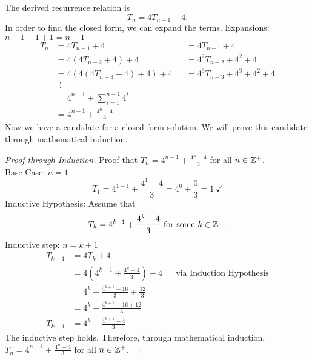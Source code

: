 \documentclass{article}
\begin{document}
\qdash

The derived recurrence relation is
\[
    T_n = 4T_{n-1} + 4.
\]
In order to find the closed form, we can expand the terms. Expansions: $n-1-1+1 = n-1$
\begin{align*}
    T_n & = 4T_{n-1} + 4                     &  & = 4T_{n-1} + 4               \\
        & = 4(4T_{n-2} + 4) + 4              &  & = 4^2T_{n-2} + 4^2 + 4       \\
        & = 4(4(4T_{n-3} + 4) + 4) + 4       &  & = 4^3T_{n-3} + 4^3 + 4^2 + 4 \\
        & ~~\vdots                                                             \\
        & = 4^{n-1} + \sum_{i = 1}^{n-1} 4^i                                   \\
        & = 4^{n-1} + \frac{4^{n}-4}{3}
\end{align*}
Now we have a candidate for a closed form solution. We will prove this candidate through mathematical induction.
\begin{proof}[Proof through Induction]
    Proof that $T_n = 4^{n-1} + \frac{4^{n}-4}{3}$ for all $n \in \mathbb{Z}^{+}$. \\
    Base Case: $n = 1$
    \[
        T_1 = 4^{1-1} + \frac{4^1-4}{3} = 4^0 + \frac{0}{3} = 1~\checkmark
    \]
    Inductive Hypothesis: Assume that
    \[
        T_k = 4^{k-1} + \frac{4^k-4}{3}~\text{for some}~k \in \mathbb{Z}^{+}.
    \]
    Inductive step: $n = k+1$
    \begin{align*}
        T_{k+1} & = 4T_{k} + 4                                                                       \\
                & = 4(4^{k-1} + \frac{4^k-4}{3}) + 4            &  & \text{via Induction Hypothesis} \\
                & = 4^{k} + \frac{4^{k+1}-16}{3} + \frac{12}{3}                                      \\
                & = 4^{k} + \frac{4^{k+1}-16 + 12}{3}                                                \\
        T_{k+1} & = 4^{k} + \frac{4^{k+1}-4}{3}
    \end{align*}
    The inductive step holds. Therefore, through mathematical induction, $T_n = 4^{n-1} + \frac{4^{n}-4}{3}$ for all $n \in \mathbb{Z}^{+}$.
\end{proof}
\qdash
\end{document}
